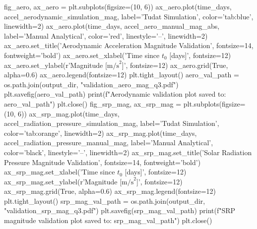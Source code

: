 {}fig_aero, ax_aero = plt.subplots(figsize=(10, 6)) ax_aero.plot(time_days, accel_aerodynamic_simulation_mag, label='Tudat Simulation', color='tab:blue', linewidth=2) ax_aero.plot(time_days, accel_aero_manual_mag_abs, label='Manual Analytical', color='red', linestyle='--', linewidth=2) ax_aero.set_title('Aerodynamic Acceleration Magnitude Validation', fontsize=14, fontweight='bold') ax_aero.set_xlabel('Time since $t_0$ [days]', fontsize=12) ax_aero.set_ylabel(r'Magnitude [$\mathrm{m/s}^2$]', fontsize=12) ax_aero.grid(True, alpha=0.6) ax_aero.legend(fontsize=12) plt.tight_layout() aero_val_path = os.path.join(output_dir, "validation_aero_mag_q3.pdf") plt.savefig(aero_val_path) print(f"Aerodynamic validation plot saved to: {aero_val_path}") plt.close()\markdownRendererInterblockSeparator
{}
\markdownRendererSectionEnd \markdownRendererSectionBegin
\markdownRendererHeadingOne{-------------------------------------------------------------------------}\markdownRendererInterblockSeparator
{}
\markdownRendererSectionEnd \markdownRendererSectionBegin
{}\markdownRendererInterblockSeparator
{}
\markdownRendererSectionEnd \markdownRendererSectionBegin
\markdownRendererHeadingOne{-------------------------------------------------------------------------}\markdownRendererInterblockSeparator
{}fig_srp_mag, ax_srp_mag = plt.subplots(figsize=(10, 6)) ax_srp_mag.plot(time_days, accel_radiation_pressure_simulation_mag, label='Tudat Simulation', color='tab:orange', linewidth=2) ax_srp_mag.plot(time_days, accel_radiation_pressure_manual_mag, label='Manual Analytical', color='black', linestyle='--', linewidth=2) ax_srp_mag.set_title('Solar Radiation Pressure Magnitude Validation', fontsize=14, fontweight='bold') ax_srp_mag.set_xlabel('Time since $t_0$ [days]', fontsize=12) ax_srp_mag.set_ylabel(r'Magnitude [$\mathrm{m/s}^2$]', fontsize=12) ax_srp_mag.grid(True, alpha=0.6) ax_srp_mag.legend(fontsize=12) plt.tight_layout() srp_mag_val_path = os.path.join(output_dir, "validation_srp_mag_q3.pdf") plt.savefig(srp_mag_val_path) print(f"SRP magnitude validation plot saved to: {srp_mag_val_path}") plt.close()\markdownRendererInterblockSeparator
{}
\markdownRendererSectionEnd \markdownRendererSectionBegin
\markdownRendererHeadingOne{-------------------------------------------------------------------------}\markdownRendererInterblockSeparator
{}
\markdownRendererSectionEnd \markdownRendererSectionBegin
{}\markdownRendererInterblockSeparator
{}
\markdownRendererSectionEnd \markdownRendererSectionBegin
